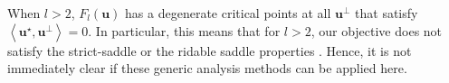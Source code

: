 \documentclass[final,12pt]{colt2018} %
\renewcommand\v[1]{{\ensuremath{\boldsymbol{#1}}}}
\newcommand\ip[1]{\left\langle #1 \right\rangle}
\begin{document}
\begin{remark} When $l>2$, $F_l(\v u)$ has a degenerate critical points at all $\v u^\perp$ that satisfy $\ip{\v u^\star, \v u^\perp}=0$. In particular, this means that for $l>2$, our objective does not satisfy the strict-saddle \citep{ge2015escaping} or the ridable saddle properties \citep{sun2015nonconvex}. Hence, it is not immediately clear if these generic analysis methods can be applied here. 
\end{remark}

\begin{comment}
\begin{remark}[Connection with Tensor PCA] The empirical version of the objective $\hat{F}_l(\v u)$ will have $\mathcal{O}(1/\sqrt{n})$ fluctuations around the population version. This structure of a degenerate critical point superimposed with $\mathcal{O}(1/\sqrt{n})$ fluctuations is reminiscent of the recent work on Tensor PCA \citep{arous2017landscape} where these fluctuations are known to create exponentially many spurious minima in the empirical objective. Furthermore, for Tensor PCA interesting computational-statistical gaps are well known. Indeed as we shall see in Section~\ref{section: single_index}, estimators based on $F_l(\v u)$ require $\tilde{\mathcal{O}}(p^{\mathcal{O}(R^2/\mu)})$ samples which is likely suboptimal. While this connection is intriguing, it is difficult to established a formal connection between the two problems since the fluctuations from the population objective in our case are not Gaussian as in the Tensor PCA problem. 
\end{remark}
\end{comment}
\end{document}
